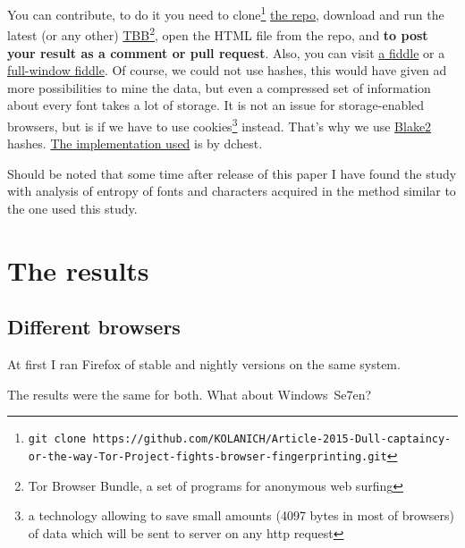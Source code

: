 \documentclass[letterpaper,14pt]{article}
\begin{document}
You can contribute, to do it you need to clone\footnote{\lstinline!git clone https://github.com/KOLANICH/Article-2015-Dull-captaincy-or-the-way-Tor-Project-fights-browser-fingerprinting.git!} \href{https://github.com/KOLANICH/Article-2015-Dull-captaincy-or-the-way-Tor-Project-fights-browser-fingerprinting}{the repo}, download and run the latest (or any other) \href{https://www.torproject.org/download/download.html.en}{TBB}\footnote{Tor Browser Bundle, a set of programs for anonymous web surfing}, open the HTML file from the repo, and \textbf{to post your result as a comment or pull request}. Also, you can visit \href{http://jsfiddle.net/fyw4qmdg/5/}{a fiddle} or a \href{http://fiddle.jshell.net/fyw4qmdg/5/show/}{full-window fiddle}. Of course, we could not use hashes, this would have given ad more possibilities to mine the data, but even a compressed set of information about every font takes a lot of storage. It is not an issue for storage-enabled browsers, but is if we have to use cookies\footnote{a technology allowing to save small amounts (4097 bytes in most of browsers) of data which will be sent to server on any http request} instead. That's why we use \href{https://en.wikipedia.org/wiki/BLAKE_%28hash_function%29}{Blake2} hashes. \href{https://github.com/dchest/blake2s-js}{The implementation used} is by dchest.

Should be noted that some time after release of this paper I have found the study\cite{Fifield2015} with analysis of entropy of fonts and characters acquired in the method similar to the one used this study.

\section{The results}\label{the-results}

\subsection{Different browsers}\label{different-browsers}

At first I ran Firefox of stable and nightly versions on the same system.



The results were the same for both. What about Windows\texttrademark\ Se7en?


\end{document}
